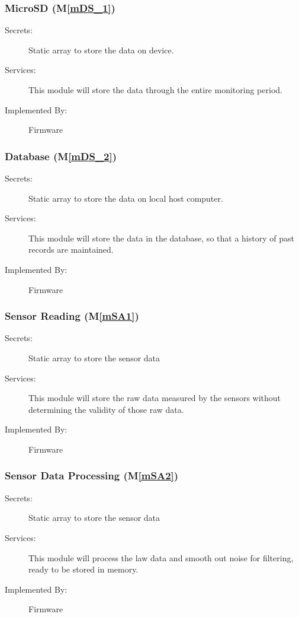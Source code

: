 \documentclass[12pt, titlepage]{article}
\newcommand{\mref}[1]{M\ref{#1}}
\begin{document}
\subsubsection{MicroSD (\mref{mDS_1})}
\begin{description}
  \item[Secrets:] Static array to store the data on device.
  \item[Services:] This module will store the data through the entire monitoring period.
  \item[Implemented By:] Firmware
\end{description}

\subsubsection{Database (\mref{mDS_2})}
\begin{description}
  \item[Secrets:] Static array to store the data on local host computer.
  \item[Services:] This module will store the data in the database, so that a history of past records are maintained.
  \item[Implemented By:] Firmware
\end{description}

\subsubsection{Sensor Reading (\mref{mSA1})}
\begin{description}
  \item[Secrets:] Static array to store the sensor data
  \item[Services:] This module will store the raw data measured by the sensors without determining the validity of those raw data.
  \item[Implemented By:] Firmware
\end{description}

\subsubsection{Sensor Data Processing (\mref{mSA2})}
\begin{description}
  \item[Secrets:] Static array to store the sensor data
  \item[Services:] This module will process the law data and smooth out noise for filtering, ready to be stored in memory.
  \item[Implemented By:] Firmware
\end{description}
\end{document}
